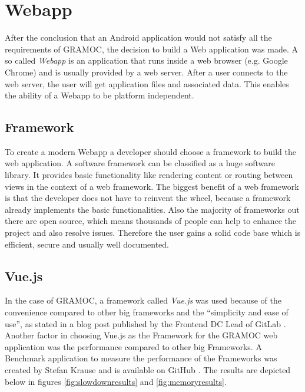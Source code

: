 \chapter{Webapp}
\label{ch:Webapp}

\author{Nico Leidenfrost}
%
After the conclusion that an Android application would not satisfy all the requirements of GRAMOC, the decision to build a Web application was made. A so called \textit{Webapp} is an application that runs inside a web browser (e.g. Google Chrome) and is usually provided by a web server. After a user connects to the web server, the user will get application files and associated data. This enables the ability of a Webapp to be platform independent.

\section{Framework}
To create a modern Webapp a developer should choose a framework to build the web application. A software framework can be classified as a huge software library. It provides basic functionality like rendering content or routing between views in the context of a web framework. The biggest benefit of a web framework is that the developer does not have to reinvent the wheel, because a framework already implements the basic functionalities. Also the majority of frameworks out there are open source, which means thousands of people can help to enhance the project and also resolve issues. Therefore the user gains a solid code base which is efficient, secure and usually well documented.

\section{Vue.js}
In the case of GRAMOC, a framework called \textit{Vue.js} was used because of the convenience compared to other big frameworks and the ``simplicity and ease of use'', as stated in a blog post published by the Frontend DC Lead of GitLab \autocite{Vue} \autocite{WhyVue} \autocite{GitLab}. Another factor in choosing Vue.js as the Framework for the GRAMOC web application was the performance compared to other big Frameworks. A Benchmark application to measure the performance of the Frameworks was created by Stefan Krause and is available on GitHub \autocite{FrameworkBenchmark}. The results are depicted below in figures \vref{fig:slowdownresults} and \vref{fig:memoryresults}.

\frameworkdata

